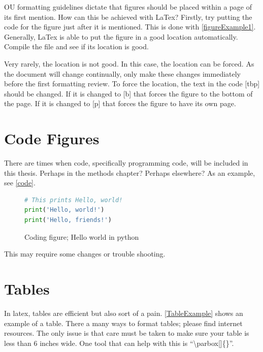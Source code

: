OU formatting guidelines dictate that figures should be placed within a page of its first mention. 
How can this be achieved with LaTex?
Firstly, try putting the code for the figure just after it is mentioned. 
This is done with \autoref{figureExample1}.
Generally, LaTex is able to put the figure in a good location automatically.
Compile the file and see if its location is good. 


Very rarely, the location is not good.
In this case, the location can be forced. 
As the document will change continually, only make these changes immediately before the first formatting review. 
To force the location, the text in the code [tbp] should be changed. 
If it is changed to [b] that forces the figure to the bottom of the page. 
If it is changed to [p] that forces the figure to have its own page. 




\section{Code Figures}

There are times when code, specifically programming code, will be included in this thesis. 
Perhaps in the methods chapter? 
Perhaps elsewhere? 
As an example, see \autoref{code}.
\begin{figure}[bp]
\begin{lstlisting}[language=Python]
# This prints Hello, world!
print('Hello, world!')
print('Hello, friends!')
\end{lstlisting}
\caption[Coding figure; Hello world in python]{Coding figure; Hello world in python}
\label{code}
\end{figure}
This may require some changes or trouble shooting.

\section{Tables}

In latex, tables are efficient but also sort of a pain. 
\autoref{TableExample} shows an example of a table. 
There a many ways to format tables; please find internet resources. 
The only issue is that care must be taken to make sure your table is less than 6 inches wide. 
One tool that can help with this is ``\textbackslash parbox[]\{\}''.

